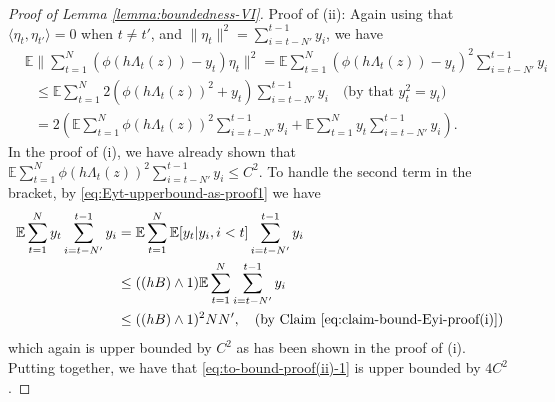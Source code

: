 \documentclass[11pt]{article}
\newcommand{\tn}[1]{\textcolor{purple}{\textsf{TG: #1}}}
\theoremstyle{remark}
\theoremstyle{plain}
\newcommand{\E}{\mathbb{E}}
\begin{document}
\begin{proof}[Proof of Lemma \ref{lemma:boundedness-VI}]
\vspace{5pt}
Proof of (ii): 
Again using that $\langle \eta_t, \eta_{t'} \rangle =0$ when $t \neq t'$, 
and $\|\eta_t\|^2 = \sum_{i = t-N'}^{t-1} y_i$,
we have
\begin{align}
&  \E \| \sum_{t=1}^N \left(\phi( h \Lambda_t (z)) - y_t \right) \eta_t \|^2 
=   \E  \sum_{t=1}^N  \left(\phi( h \Lambda_t (z)) - y_t  \right)^2  \sum_{i = t-N'}^{t-1} y_i  \nonumber \\
& ~~~
\le  \E  \sum_{t=1}^N  2 \left( \phi( h \Lambda_t (z))^2 + y_t  \right)  \sum_{i = t-N'}^{t-1} y_i 
	\quad \text{(by that $y_t^2 = y_t$)}  \nonumber \\
& ~~~
= 2 \left(  \E  \sum_{t=1}^N  \phi( h \Lambda_t (z))^2  \sum_{i = t-N'}^{t-1} y_i 
  + 	       \E  \sum_{t=1}^N   y_t  \sum_{i = t-N'}^{t-1} y_i   \right).
   \label{eq:to-bound-proof(ii)-1}
\end{align}
In the proof of (i), we have already shown that $\E  \sum_{t=1}^N  \phi( h \Lambda_t (z))^2  \sum_{i = t-N'}^{t-1} y_i  \le C^2$.
To handle the second term in the bracket,
by \eqref{eq:Eyt-upperbound-as-proof1} we have
\begin{align*}
 \E  \sum_{t=1}^N   y_t  \sum_{i = t-N'}^{t-1} y_i 
&  =  \E  \sum_{t=1}^N   \E [ y_t | y_i, i <t ]   \sum_{i = t-N'}^{t-1} y_i   \\
& \le ( (hB) \wedge 1)  \E  \sum_{t=1}^N   \sum_{i = t-N'}^{t-1} y_i  \\
& \le ( (hB) \wedge 1)^2 N N', 
	\quad \text{(by Claim \eqref{eq:claim-bound-Eyi-proof(i)})} 
\end{align*}
which again is upper bounded by $C^2$ as has been shown in the proof of (i). 
Putting together, we have that \eqref{eq:to-bound-proof(ii)-1} is upper bounded by $4 C^2$.
\end{proof}
\end{document}
